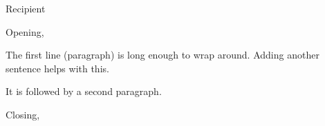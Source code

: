 \documentclass[a4paper]{letter}
\begin{document}
\begin{letter}{Recipient}
	\opening{Opening,}

	The first line (paragraph) is long enough to wrap around.
	Adding another sentence helps with this.

	It is followed by a second paragraph.

	\closing{Closing,}
\end{letter}
\end{document}
